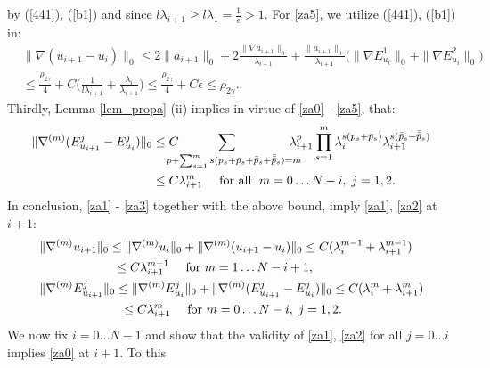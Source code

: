 \documentclass[reqno,twoside,11pt]{amsart}
\newcommand*{\dbar}[1]{\bar{\bar{#1}}}
\newcommand*{\tbar}[1]{\bar{\dbar{#1}}}
\numberwithin{equation}{section}
\theoremstyle{plain}
\theoremstyle{definition}
\begin{document}
by (\ref{441}), (\ref{b1}) and since $l\lambda_{i+1}\geq l\lambda_1=\frac{1}{\epsilon}>1$.
For \ref{za5}, we utilize (\ref{441}),  (\ref{b1}) in:
\begin{equation*}
\begin{split}
& \|\nabla (u_{i+1}-u_i)\|_0\leq 2\|a_{i+1}\|_0+ 2\frac{\|\nabla a_{i+1}\|_0}{\lambda_{i+1}}
+ \frac{\|a_{i+1}\|_0}{\lambda_{i+1}}\big(\|\nabla E_{u_i}^1\|_0 +
\|\nabla E_{u_i}^2\|_0\big)\\ & \leq \frac{\rho_{2\underline\gamma}}{4} +
C\big(\frac{1}{l\lambda_{i+1}} +\frac{\lambda_i}{\lambda_{i+1}}\big)
\leq \frac{\rho_{2\underline\gamma}}{4} + C\epsilon\leq \rho_{2\underline\gamma}.
\end{split}
\end{equation*}
Thirdly, Lemma \ref{lem_propa} (ii) implies in virtue of \ref{za0} - \ref{za5}, that:
\begin{equation*}
\begin{split}
\|\nabla^{(m)}(E_{u_{i+1}}^j - E_{u_i}^j)\|_0 & \leq C \hspace{-4mm}
\sum_{p+\sum_{s=1}^m s(p_s+\bar p_s+\dbar p_s+\tbar p_s)=m\hspace{-4mm}}
\lambda_{i+1}^p \prod_{s=1}^m\lambda_i^{s(p_s+\bar p_s)}\lambda_{i+1}^{s(\dbar p_s+\tbar p_s)}
\\ & \leq C\lambda_{i+1}^m \quad\mbox{ for all } \; m=0\ldots N-i, \; j=1,2.
\end{split}
\end{equation*}
In conclusion, \ref{za1} - \ref{za3} together with the
above bound, imply \ref{za1}, \ref{za2} at $i+1$:
\begin{equation*}
\begin{split}
& \|\nabla^{(m)} u_{i+1}\|_0 \leq \|\nabla^{(m)}u_i\|_0 + \|\nabla^{(m)}(u_{i+1}-u_i)\|_0 \leq
C(\lambda_i^{m-1}+\lambda_{i+1}^{m-1}) \\ & \hspace{21mm} \leq C \lambda_{i+1}^{m-1}
\quad \mbox{ for } m=1\ldots N-i+1,
\\ & \|\nabla^{(m)}E_{u_{i+1}}^j\|_0 \leq
\|\nabla^{(m)}E_{u_{i}}^j\|_0 + \|\nabla^{(m)}(E_{u_{i+1}}^j -
E_{u_i}^j)\|_0 \leq C(\lambda_i^{m}+\lambda_{i+1}^{m})
\\ & \hspace{23mm} \leq C \lambda_{i+1}^{m} \quad \mbox{ for } m=0\ldots N-i,\;j=1,2.
\end{split}
\end{equation*}
We now fix $i=0\ldots N-1$ and show that the validity of \ref{za1},
\ref{za2} for all $j=0\ldots i$ implies \ref{za0} at $i+1$. To this
\end{document}
